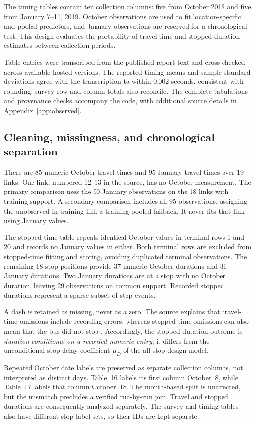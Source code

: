 \documentclass[11pt]{article}
\theoremstyle{remark}\newtheorem{remark}[theorem]{Remark}
\begin{document}
The timing tables contain ten collection columns: five from October 2018 and five from January 7--11, 2019. October observations are used to fit location-specific and pooled predictors, and January observations are reserved for a chronological test. This design evaluates the portability of travel-time and stopped-duration estimates between collection periods.

Table entries were transcribed from the published report text and cross-checked across available hosted versions. The reported timing means and sample standard deviations agree with the transcription to within 0.002 seconds, consistent with rounding; survey row and column totals also reconcile. The complete tabulations and provenance checks accompany the code, with additional source details in Appendix~\ref{app:observed}.

\subsection{Cleaning, missingness, and chronological separation}
There are 85 numeric October travel times and 95 January travel times over 19 links. One link, numbered 12--13 in the source, has no October measurement. The primary comparison uses the 90 January observations on the 18 links with training support. A secondary comparison includes all 95 observations, assigning the unobserved-in-training link a training-pooled fallback. It never fits that link using January values.

The stopped-time table repeats identical October values in terminal rows 1 and 20 and records no January values in either. Both terminal rows are excluded from stopped-time fitting and scoring, avoiding duplicated terminal observations. The remaining 18 stop positions provide 37 numeric October durations and 31 January durations. Two January durations are at a stop with no October duration, leaving 29 observations on common support. Recorded stopped durations represent a sparse subset of stop events.

A dash is retained as missing, never as a zero. The source explains that travel-time omissions include recording errors, whereas stopped-time omissions can also mean that the bus did not stop \cite{videa}. Accordingly, the stopped-duration outcome is \emph{duration conditional on a recorded numeric entry}; it differs from the unconditional stop-delay coefficient $\mu_D$ of the all-stop design model.

Repeated October date labels are preserved as separate collection columns, not interpreted as distinct days. Table~16 labels its first column October~8, while Table~17 labels that column October~18. The month-based split is unaffected, but the mismatch precludes a verified run-by-run join. Travel and stopped durations are consequently analyzed separately. The survey and timing tables also have different stop-label sets, so their IDs are kept separate.
\end{document}
